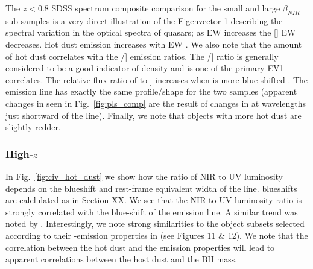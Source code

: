 The $z < 0.8$ SDSS spectrum composite comparison for the small and large $\beta_{NIR}$ sub-samples is a very direct illustration of the \citet{boroson92} Eigenvector 1 describing the spectral variation in the optical spectra of quasars; as  EW increases the [] EW decreases. 
Hot dust emission increases with  EW \citep{shen14}. 
We also note that the amount of hot dust correlates with the /] emission ratios. 
The /] ratio is generally considered to be a good indicator of density and is one of the primary EV1 correlates. 
The relative flux ratio of  to ] increases when  is more blue-shifted \citep{richards11}. 
The  emission line has exactly the same profile/shape for the two samples (apparent changes in  seen in Fig.~\ref{fig:pls_comp} are the result of changes in  at wavelengths just shortward of the line). 
Finally, we note that objects with more hot dust are slightly redder.

\subsubsection{High-$z$}

In Fig.~\ref{fig:civ_hot_dust} we show how the ratio of NIR to UV luminosity depends on the blueshift and rest-frame equivalent width of the  line.
 blueshifts are calclulated as in Section XX. 
We see that the NIR to UV luminosity ratio is strongly correlated with the blue-shift of the  emission line. 
A similar trend was noted by \citet{wang13}. 
Interestingly, we note strong similarities to the object subsets selected according to their -emission properties in \citet{richards11} (see Figures 11 \& 12).  
We note that the correlation between the hot dust and the  emission properties will lead to apparent correlations between the host dust and the BH mass. 
 
